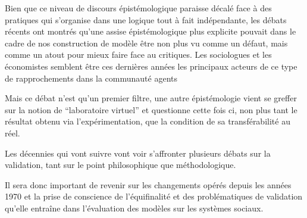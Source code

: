 

Bien que ce niveau de discours épistémologique paraisse décalé face à des pratiques qui s'organise dans une logique tout à fait indépendante, les débats récents ont montrés qu'une assise épistémologique plus explicite pouvait dans le cadre de nos construction de modèle être non plus vu comme un défaut, mais comme un atout pour mieux faire face au critiques. Les sociologues \autocite{Hedstrom2010, Elsenbroich2012, Squazzoni2010, Manzo2007} et les économistes \autocite{Epstein1996} semblent être ces dernières années les principaux acteurs de ce type de rapprochements dans la communauté agents 

Mais ce débat n'est qu'un premier filtre, une autre épistémologie vient se greffer sur la notion de \enquote{laboratoire virtuel} et questionne cette fois ci, non plus tant le résultat obtenu via l'expérimentation, que la condition de sa transférabilité au réel.

Les décennies qui vont suivre vont voir s'affronter plusieurs débats sur la validation, tant sur le point philosophique que méthodologique.


Il sera donc important de revenir sur les changements opérés depuis les années 1970 et la prise de conscience de l'équifinalité et des problématiques de validation qu'elle entraîne dans l'évaluation des modèles sur les systèmes sociaux.


